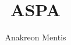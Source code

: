 \documentclass[a4paper, 12pt]{article}
\begin{document}
  \title{ASPA}
  \author{Anakreon Mentis}
  \maketitle
\begin{abstract}
\end{abstract}
\end{document}

